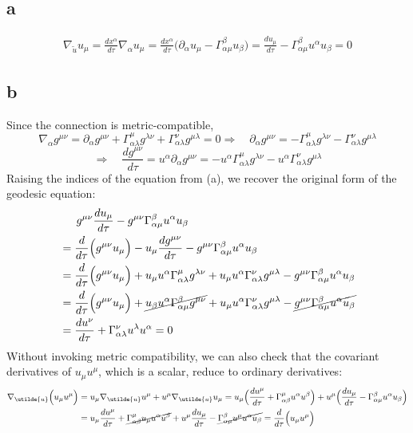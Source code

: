 \documentclass{article}
\begin{document}
\subsection*{a}
\begin{align*}
 \nabla_{\utilde{u}}u_\mu = \frac{dx^\alpha}{d\tau} \nabla_{\alpha}u_\mu
= \frac{dx^\alpha}{d\tau} \Big(\partial_\alpha u_\mu - \Gamma^{\beta}_{\alpha\mu}u_\beta \Big)
= \frac{du_\mu}{d\tau} - \Gamma^\beta_{\alpha\mu}u^\alpha u_\beta = 0
\end{align*}
\subsection*{b}
Since the connection is metric-compatible,
\[\nabla_\alpha g^{\mu\nu} = \partial_\alpha g^{\mu\nu} + \Gamma^{\mu}_{\alpha\lambda} g^{\lambda\nu} + \Gamma ^{\nu}_{\alpha\lambda} g^{\mu\lambda} = 0
\Rightarrow\quad \partial_\alpha g^{\mu\nu} = -\Gamma^{\mu}_{\alpha\lambda} g^{\lambda\nu} - \Gamma ^{\nu}_{\alpha\lambda} g^{\mu\lambda}\]
\[ \Rightarrow\quad \frac{dg^{\mu\nu}}{d\tau} = u^\alpha  \partial_\alpha g^{\mu\nu} = -u^\alpha\Gamma^{\mu}_{\alpha\lambda} g^{\lambda\nu} - u^\alpha\Gamma ^{\nu}_{\alpha\lambda} g^{\mu\lambda} \]
Raising the indices of the equation from (a), we recover the original form of the geodesic equation:
\begin{align*} 
	&\indent g^{\mu\nu}\frac{du_\mu}{d\tau} - g^{\mu\nu}\Gamma^\beta_{\alpha\mu}u^\alpha u_\beta \\
&= \frac{d}{d\tau}\Big(g^{\mu\nu}u_\mu \Big) -  u_\mu\frac{dg^{\mu\nu}}{d\tau}- g^{\mu\nu} \Gamma^\beta_{\alpha\mu}u^\alpha u_\beta \\
&= \frac{d}{d\tau}\Big(g^{\mu\nu}u_\mu \Big) +  u_\mu u^\alpha\Gamma^{\mu}_{\alpha\lambda} g^{\lambda\nu} + u_\mu  u^\alpha\Gamma ^{\nu}_{\alpha\lambda} g^{\mu\lambda} - g^{\mu\nu} \Gamma^\beta_{\alpha\mu}u^\alpha u_\beta \\
&= \frac{d}{d\tau}\Big(g^{\mu\nu}u_\mu \Big) +  \cancel{u_\beta u^\alpha\Gamma^{\beta}_{\alpha\mu} g^{\mu\nu}} + u_\mu  u^\alpha\Gamma ^{\nu}_{\alpha\lambda} g^{\mu\lambda} - \cancel{g^{\mu\nu} \Gamma^\beta_{\alpha\mu}u^\alpha u_\beta} \\
&= \frac{du^\nu}{d\tau} + \Gamma ^{\nu}_{\alpha\lambda}u^\lambda  u^\alpha = 0
\end{align*}
Without invoking metric compatibility, we can also check that the covariant derivatives of $u_\mu u^\mu$, which is a scalar, reduce to ordinary derivatives:
\begin{align*}
 \nabla_{\utilde{u}} \Big(u_\mu u^\mu\Big) 
&= u_\mu \nabla_{\utilde{u}} u^\mu + u^\mu \nabla_{\utilde{u}} u_\mu 
=  u_\mu \Big(\frac{du^\mu}{d\tau} + \Gamma^\mu_{\alpha\beta}u^\alpha u^\beta \Big)
	+ u^\mu \Big(  \frac{du_\mu}{d\tau} - \Gamma^\beta_{\alpha\mu}u^\alpha u_\beta \Big)\\
&=  u_\mu\frac{du^\mu}{d\tau} + \cancel{\Gamma^\mu_{\alpha\beta}u_\mu u^\alpha u^\beta}
	+  u^\mu  \frac{du_\mu}{d\tau} - \cancel{\Gamma^\beta_{\alpha\mu}u^\mu  u^\alpha u_\beta}
= \frac{d}{d\tau}\Big(u_\mu u^\mu \Big)
\end{align*}
\end{document}
